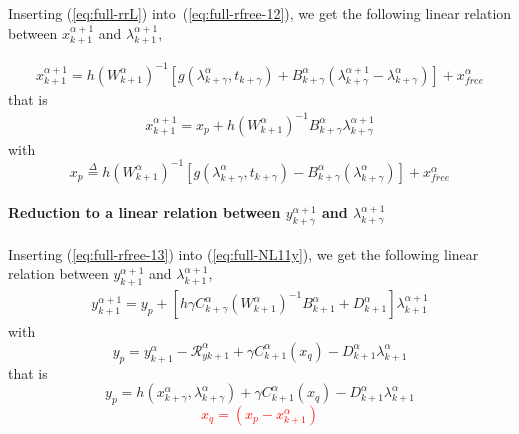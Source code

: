 Inserting (\ref{eq:full-rrL}) into~(\ref{eq:full-rfree-12}), we get the following linear relation between $x^{\alpha+1}_{k+1}$ and
$\lambda^{\alpha+1}_{k+1}$, 

\begin{equation}
   \begin{array}{l}
     x^{\alpha+1}_{k+1} = h(W^{\alpha}_{k+1} )^{-1}\left[g(\lambda^{\alpha}_{k+\gamma},t_{k+\gamma}) +
    B^{\alpha}_{k+\gamma} (\lambda^{\alpha+1}_{k+\gamma} - \lambda^{\alpha}_{k+\gamma}) \right ] +x^\alpha_{free}
\end{array}
\end{equation}
that is 
\begin{equation}
  \begin{array}{l}
\boxed{x^{\alpha+1}_{k+1}=x_p + h (W^{\alpha}_{k+1})^{-1}    B^{\alpha}_{k+\gamma} \lambda^{\alpha+1}_{k+\gamma}}
   \end{array}
  \label{eq:full-rfree-13}
\end{equation}
with 
\begin{equation}
  \boxed{x_p \stackrel{\Delta}{=}  h(W^{\alpha}_{k+1} )^{-1}\left[g(\lambda^{\alpha}_{k+\gamma},t_{k+\gamma}) -B^{\alpha}_{k+\gamma} (\lambda^{\alpha}_{k+\gamma}) \right ] +x^\alpha_{free}}
\end{equation}


\paragraph{Reduction to a linear relation between  $y^{\alpha+1}_{k+\gamma}$ and
$\lambda^{\alpha+1}_{k+\gamma}$}

Inserting (\ref{eq:full-rfree-13}) into (\ref{eq:full-NL11y}), we get the following linear relation between $y^{\alpha+1}_{k+1}$ and $\lambda^{\alpha+1}_{k+1}$, 
\begin{equation}
   \begin{array}{l}
 y^{\alpha+1}_{k+1} = y_p + \left[ h \gamma C^{\alpha}_{k+\gamma} ( W^{\alpha}_{k+1})^{-1}  B^{\alpha}_{k+1} + D^{\alpha}_{k+1} \right]\lambda^{\alpha+1}_{k+1}
   \end{array}
\end{equation}
with 
\begin{equation}
y_p = y^{\alpha}_{k+1} -\mathcal R^{\alpha}_{yk+1} + \gamma C^{\alpha}_{k+1}(x_q) - D^{\alpha}_{k+1} \lambda^{\alpha}_{k+1} 
\end{equation}
that is 
\begin{equation}\boxed{
y_p =  h(x^{\alpha}_{k+\gamma},\lambda^{\alpha}_{k+\gamma}) + \gamma C^{\alpha}_{k+1}(x_q) - D^{\alpha}_{k+1} \lambda^{\alpha}_{k+1} }
\end{equation}
\textcolor{red}{
  \begin{equation}
   \boxed{ x_q=(x_p -x^{\alpha}_{k+1})\label{eq:full-xqq}}
  \end{equation}
}


